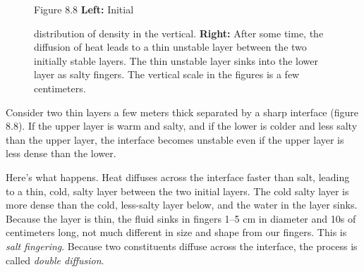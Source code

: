 \begin{figure}[h!]
\footnotesize
Figure 8.8 \textbf{Left:} Initial \rule{0mm}{4ex}distribution of
density in the vertical. \textbf{Right:} After some time, the diffusion of heat
leads to a thin unstable layer between the two initially stable layers. The thin
unstable layer sinks into the lower layer as salty fingers. The vertical scale
in the figures is a few centimeters.
\label{fig:saltfingers}
\vspace{-2ex}
\end{figure}

Consider two thin layers a few meters thick separated by a sharp interface (figure
8.8). If the upper layer is warm and salty, and if the lower is colder and less
salty than the upper layer, the interface becomes unstable even if the upper layer
is less dense than the lower.

Here's what happens. Heat diffuses across the interface faster than salt, leading to a thin, cold, salty layer
between the two initial layers. The cold salty layer is more dense than the cold, less-salty layer below, and the
water in the layer sinks. Because the layer is thin, the fluid sinks in fingers 1--5 cm in diameter and 10s of
centimeters long, not much different in size and shape from our fingers. This is \textit{salt fingering}. Because two constituents diffuse across the interface, the process is called \textit{double
diffusion}.

